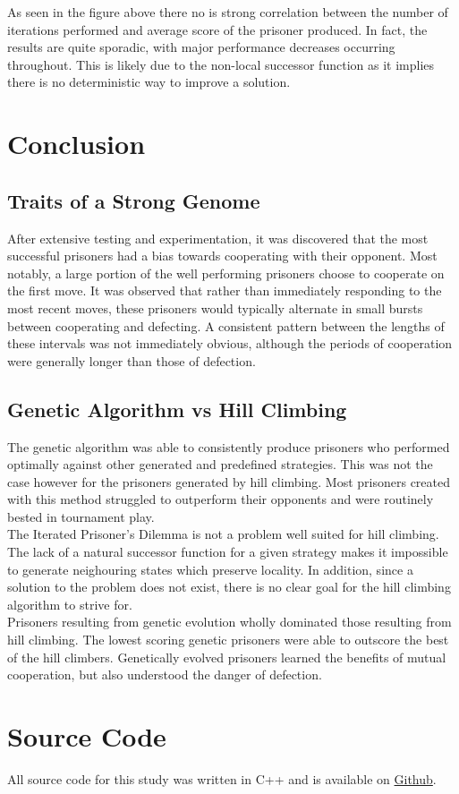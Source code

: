 \documentclass[12pt]{article}
\begin{document}
As seen in the figure above there no is strong correlation between the number
of iterations performed and average score of the prisoner produced.  In fact, the results
are quite sporadic, with major performance decreases occurring throughout.  This is
likely due to the non-local successor function as it implies there is no deterministic way
to improve a solution.

\pagebreak

\section{Conclusion}

\subsection{Traits of a Strong Genome}
After extensive testing and experimentation, it was discovered that the most successful prisoners
had a bias towards cooperating with their opponent. Most notably, a large portion of
the well performing prisoners choose to cooperate on the first move.
It was observed that rather than immediately responding to the most recent moves, these prisoners would
typically alternate in small bursts between cooperating and defecting. A consistent
pattern between the lengths of these intervals was not immediately obvious, although
the periods of cooperation were generally longer than those of defection.

\subsection{Genetic Algorithm vs Hill Climbing}
The genetic algorithm was able to consistently produce prisoners who performed
optimally against other generated and predefined strategies. This was not the
case however for the prisoners generated by hill climbing. Most prisoners created with this method struggled to outperform their opponents
and were routinely bested in tournament play. \\

The Iterated Prisoner's Dilemma is not a problem well suited for hill climbing.
The lack of a natural successor function for a given strategy makes it impossible
to generate neighouring states which preserve locality.  In addition, since
a solution to the problem does not exist, there is no clear goal for the hill climbing algorithm
to strive for. \\


Prisoners resulting from genetic evolution wholly dominated those resulting
from hill climbing.  The lowest scoring genetic prisoners were able to outscore
the best of the hill climbers.  Genetically evolved prisoners learned the benefits
of mutual cooperation, but also understood the danger of defection.

\pagebreak

\section{Source Code}
All source code for this study was written in C++ and is
available on
\href{https://github.com/Quinny/IteratedPrisoners}{Github}.
\end{document}
